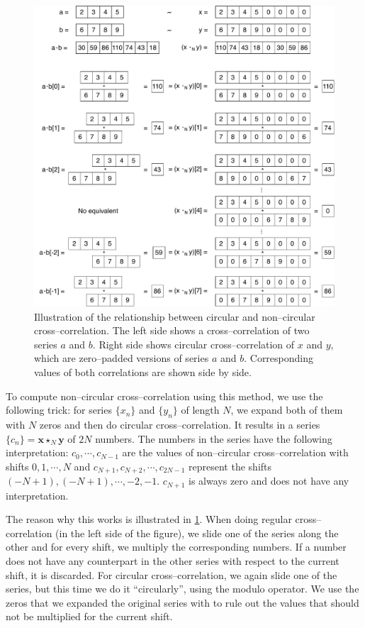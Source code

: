 \begin{figure}
	\centering
	\includegraphics[width=\textwidth]{img/circ-cross-example}
	\caption{Illustration of the relationship between circular and non--circular cross--correlation. The left side shows a cross--correlation of two series $a$ and $b$. Right side shows circular cross--correlation of $x$ and $y$, which are zero--padded versions of series $a$ and $b$. Corresponding values of both correlations are shown side by side.}
	\label{circ-cross-example}
\end{figure}

To compute non--circular cross--correlation using this method, we use the following trick: for series $\{x_n\}$ and $\{y_n\}$ of length $N$, we expand both of them with $N$ zeros and then do circular cross--correlation. It results in a series $\{c_n\} = \mathbf{x} \star_N \mathbf{y}$ of $2N$ numbers. The numbers in the series have the following interpretation: $c_0, \cdots, c_{N-1}$ are the values of non--circular cross--correlation with shifts $0, 1, \cdots, N$ and $c_{N+1}, c_{N+2}, \cdots, c_{2N-1}$ represent the shifts $(-N+1), (-N+1), \cdots, -2, -1$. $c_{N+1}$ is always zero and does not have any interpretation.

The reason why this works is illustrated in \cref{circ-cross-example}. When doing regular cross--correlation (in the left side of the figure), we slide one of the series along the other and for every shift, we multiply the corresponding numbers. If a number does not have any counterpart in the other series with respect to the current shift, it is discarded. For circular cross--correlation, we again slide one of the series, but this time we do it ``circularly'', using the modulo operator. We use the zeros that we expanded the original series with to rule out the values that should not be multiplied for the current shift.

